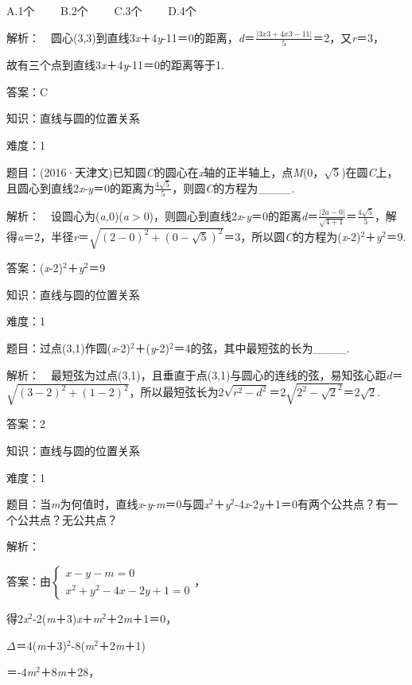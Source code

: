 \documentclass{article} %
\begin{document}
A.1个　　 B.2个　　 C.3个　　 D.4个

解析：　圆心(3,3)到直线3\textit{x}＋4\textit{y}-11＝0的距离，\textit{d}＝$\frac{|3x3+4x3-11|}{5}$＝2，又\textit{r}＝3，

故有三个点到直线3\textit{x}＋4\textit{y}-11＝0的距离等于1.

答案：C

知识：直线与圆的位置关系

难度：1

题目：(2016·天津文)已知圆\textit{C}的圆心在\textit{x}轴的正半轴上，点\textit{M}(0，$\sqrt{5}$)在圆\textit{C}上，且圆心到直线2\textit{x}-\textit{y}＝0的距离为$\frac{4\sqrt{5}}{5}$，则圆\textit{C}的方程为\_\_\_\_.

解析：　设圆心为(\textit{a,}0)(\textit{a}$\mathrm{>}$0)，则圆心到直线2\textit{x}-\textit{y}＝0的距离\textit{d}＝$\frac{|2a-0|}{\sqrt{4+1}}$＝$\frac{4\sqrt{5}}{5}$，解得\textit{a}＝2，半径\textit{r}＝$\sqrt{(2-0)^2+(0-\sqrt{5})^2}$＝3，所以圆\textit{C}的方程为(\textit{x}-2)${}^{2}$＋\textit{y}${}^{2}$＝9.

答案：(\textit{x}-2)${}^{2}$＋\textit{y}${}^{2}$＝9

知识：直线与圆的位置关系

难度：1

题目：过点(3,1)作圆(\textit{x}-2)${}^{2}$＋(\textit{y}-2)${}^{2}$＝4的弦，其中最短弦的长为\_\_\_\_.

解析：　最短弦为过点(3,1)，且垂直于点(3,1)与圆心的连线的弦，易知弦心距\textit{d}＝$\sqrt{(3-2)^2+(1-2)^2}$，所以最短弦长为$2\sqrt{r^2-d^2}$＝$2\sqrt{2^2-\sqrt{2}^2}$＝$2\sqrt{2}$.

答案：2


知识：直线与圆的位置关系

难度：1

题目：当\textit{m}为何值时，直线\textit{x}-\textit{y}-\textit{m}＝0与圆\textit{x}${}^{2}$＋\textit{y}${}^{2}$-4\textit{x}-2\textit{y}＋1＝0有两个公共点？有一个公共点？无公共点？

解析：

答案：由$\left\{\begin{array}{r} x-y-m=0\\ x^2+y^2-4x-2y+1=0 \end{array} \right.$，

得2\textit{x}${}^{2}$-2(\textit{m}＋3)\textit{x}＋\textit{m}${}^{2}$＋2\textit{m}＋1＝0，

$\Delta$＝4(\textit{m}＋3)${}^{2}$-8(\textit{m}${}^{2}$＋2\textit{m}＋1)

＝-4\textit{m}${}^{2}$＋8\textit{m}＋28，
\end{document}
